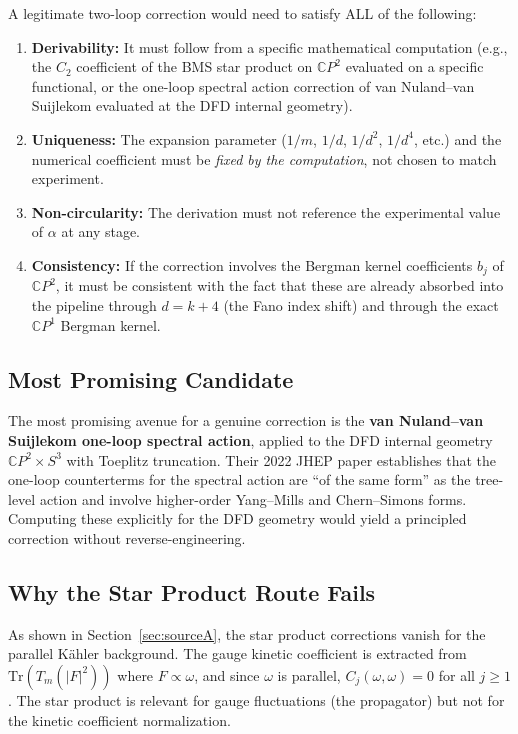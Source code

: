 \documentclass[12pt,a4paper]{article}
\theoremstyle{definition}
\theoremstyle{remark}
\newcommand{\CP}{\mathbb{C}P}
\newcommand{\Tr}{\mathrm{Tr}}
\begin{document}
A legitimate two-loop correction would need to satisfy ALL of the following:

\begin{enumerate}
\item \textbf{Derivability:} It must follow from a specific mathematical
  computation (e.g., the $C_2$ coefficient of the BMS star product on $\CP^2$
  evaluated on a specific functional, or the one-loop spectral action
  correction of van Nuland--van Suijlekom evaluated at the DFD internal
  geometry).

\item \textbf{Uniqueness:} The expansion parameter ($1/m$, $1/d$, $1/d^2$,
  $1/d^4$, etc.) and the numerical coefficient must be \emph{fixed by the
  computation}, not chosen to match experiment.

\item \textbf{Non-circularity:} The derivation must not reference the
  experimental value of $\alpha$ at any stage.

\item \textbf{Consistency:} If the correction involves the Bergman kernel
  coefficients $b_j$ of $\CP^2$, it must be consistent with the fact that
  these are already absorbed into the pipeline through $d = k + 4$ (the
  Fano index shift) and through the exact $\CP^1$ Bergman kernel.
\end{enumerate}

\subsection{Most Promising Candidate}

The most promising avenue for a genuine correction is the
\textbf{van Nuland--van Suijlekom one-loop spectral action}, applied to the
DFD internal geometry $\CP^2 \times S^3$ with Toeplitz truncation. Their
2022 JHEP paper establishes that the one-loop counterterms for the spectral
action are ``of the same form'' as the tree-level action and involve
higher-order Yang--Mills and Chern--Simons forms. Computing these explicitly
for the DFD geometry would yield a principled correction without
reverse-engineering.

\subsection{Why the Star Product Route Fails}

As shown in Section~\ref{sec:sourceA}, the star product corrections vanish
for the parallel K\"ahler background. The gauge kinetic coefficient is
extracted from $\Tr(T_m(|F|^2))$ where $F \propto \omega$, and since $\omega$
is parallel, $C_j(\omega, \omega) = 0$ for all $j \geq 1$. The star product
is relevant for gauge fluctuations (the propagator) but not for the kinetic
coefficient normalization.
\end{document}
